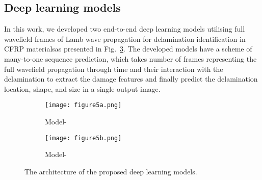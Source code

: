 \subsection{Deep learning models}
\label{proposed_approach}
In this work, we developed two end-to-end deep learning models utilising full wavefield frames of Lamb wave propagation for delamination identification in CFRP materials\DIFaddbegin \DIFadd{, }\DIFaddend as presented in Fig.~\ref{fig:proposed_models}.
The developed models have a scheme of many-to-one sequence prediction, which takes \DIFdelbegin {}\DIFdelend \DIFaddbegin {}\DIFaddend number of frames representing the full wavefield propagation through time and their interaction with the delamination to extract the damage features \DIFdelbegin \DIFdel{, }\DIFdelend and finally predict the delamination location, shape, and size in a single output image.
\DIFaddbegin {}\DIFaddend %
\begin{figure} [!h]
	\centering
	\begin{subfigure}[b]{0.49\textwidth}
		\centering
		\DIFdelbeginFL %
\DIFdelendFL \DIFaddbeginFL \texttt{[image: figure5a.png]}
		\DIFaddendFL \caption{Model-} %
		\label{fig:convlstm_model}
	\end{subfigure}
	\hfill
	\begin{subfigure}[b]{0.49\textwidth}
		\centering
		\DIFdelbeginFL %
\DIFdelendFL \DIFaddbeginFL \texttt{[image: figure5b.png]}
		\DIFaddendFL \caption{Model-} %
		\label{fig:AE_convlstm}
	\end{subfigure}
	\caption{The architecture of the proposed deep learning models.}
	\label{fig:proposed_models}
\end{figure} 

